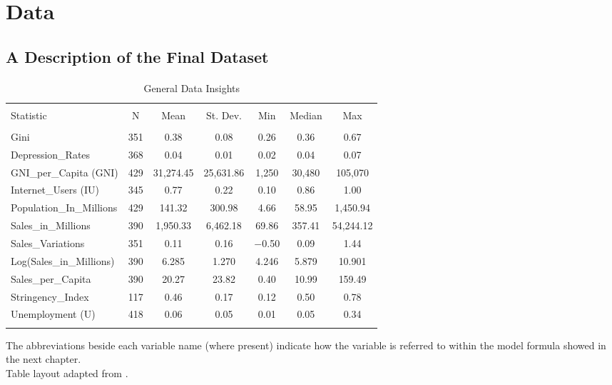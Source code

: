 \chapter{Data}\label{chap:sit}

\section{A Description of the Final Dataset}
\subsubsection{}
\begin{table}[!htbp] \centering 
  \caption{General Data Insights} 
  \label{tab:descrittive} 
\begin{tabular}{@{\extracolsep{5pt}}lcccccc} 
\\[-1.8ex]\hline 
\hline \\[-1.8ex] 
Statistic & \multicolumn{1}{c}{N} & \multicolumn{1}{c}{Mean} & \multicolumn{1}{c}{St. Dev.} & \multicolumn{1}{c}{Min} & \multicolumn{1}{c}{Median} & \multicolumn{1}{c}{Max} \\ 
\hline \\[-1.8ex] 
Gini & 351 & 0.38 & 0.08 & 0.26 & 0.36 & 0.67 \\ 
Depression\_Rates & 368 & 0.04 & 0.01 & 0.02 & 0.04 & 0.07 \\ 
GNI\_per\_Capita (GNI) & 429 & 31,274.45 & 25,631.86 & 1,250 & 30,480 & 105,070 \\ 
Internet\_Users (IU)& 345 & 0.77 & 0.22 & 0.10 & 0.86 & 1.00 \\ 
Population\_In\_Millions & 429 & 141.32 & 300.98 & 4.66 & 58.95 & 1,450.94 \\ 
Sales\_in\_Millions & 390 & 1,950.33 & 6,462.18 & 69.86 & 357.41 & 54,244.12 \\ 
Sales\_Variations & 351 & 0.11 & 0.16 & $-$0.50 & 0.09 & 1.44 \\ 
Log(Sales\_in\_Millions) & 390 & 6.285 & 1.270 & 4.246 & 5.879 & 10.901 \\ 
Sales\_per\_Capita & 390 & 20.27 & 23.82 & 0.40 & 10.99 & 159.49 \\ 
Stringency\_Index & 117 & 0.46 & 0.17 & 0.12 & 0.50 & 0.78 \\ 
Unemployment (U) & 418 & 0.06 & 0.05 & 0.01 & 0.05 & 0.34 \\ 
\hline \\[-1.8ex] 
\end{tabular} 
\end{table} 
\small The abbreviations beside each variable name (where present) indicate 
how the variable is referred to within the model formula showed in the next chapter.\\
Table layout adapted from \cite{stargazer}.

